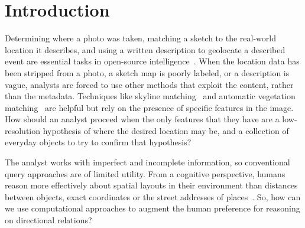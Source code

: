 \section{Introduction}

\label{section:introduction}


\par{
    Determining where a photo was taken, matching a sketch to the real-world location it describes, and using a written description to geolocate a described event are essential tasks in open-source intelligence~\cite{Higgins2021}.
    When the location data has been stripped from a photo, a sketch map is poorly labeled, or a description is vague, analysts are forced to use other methods that exploit the content, rather than the metadata.
    Techniques like skyline matching~\cite{Stein1995, Baatz2012} and automatic vegetation matching~\cite{Schmidt2022} are helpful but rely on the presence of specific features in the image.
    How should an analyst proceed when the only features that they have are a low-resolution hypothesis of where the desired location may be, and a collection of everyday objects to try to confirm that hypothesis?
}
\par{
    The analyst works with imperfect and incomplete information, so conventional query approaches are of limited utility. 
    From a cognitive perspective, humans reason more effectively about spatial layouts in their environment than distances between objects, exact coordinates or the street addresses of places~\cite{Schwering2014, Weisberg2016, Miller2013, Keatley2021}.
    So, how can we use computational approaches to augment the human preference for reasoning on directional relations?
}

